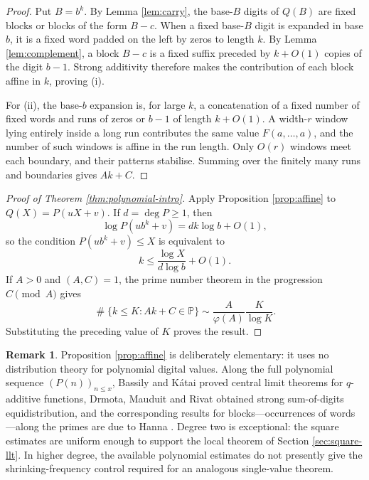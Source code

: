 \documentclass[11pt,reqno]{amsart}
\theoremstyle{plain}
\theoremstyle{definition}
\newtheorem{remark}[theorem]{Remark}
\newcommand{\Pp}{\mathbb{P}}
\newcommand{\1}{\mathbf 1}
\DeclareMathOperator{\Card}{\#}
\begin{document}
\begin{proof}
Put $B=b^k$.  By Lemma \ref{lem:carry}, the base-$B$ digits of $Q(B)$ are fixed blocks or blocks of the form $B-c$.  When a fixed base-$B$ digit is expanded in base $b$, it is a fixed word padded on the left by zeros to length $k$.  By Lemma \ref{lem:complement}, a block $B-c$ is a fixed suffix preceded by $k+O(1)$ copies of the digit $b-1$.  Strong additivity therefore makes the contribution of each block affine in $k$, proving (i).

For (ii), the base-$b$ expansion is, for large $k$, a concatenation of a fixed number of fixed words and runs of zeros or $b-1$ of length $k+O(1)$.  A width-$r$ window lying entirely inside a long run contributes the same value $F(a,\ldots,a)$, and the number of such windows is affine in the run length.  Only $O(r)$ windows meet each boundary, and their patterns stabilise.  Summing over the finitely many runs and boundaries gives $Ak+C$.
\end{proof}

\begin{proof}[Proof of Theorem \ref{thm:polynomial-intro}]
Apply Proposition \ref{prop:affine} to
$Q(X)=P(uX+v)$.
If $d=\deg P\ge1$, then
\[
 \log P(ub^k+v)=dk\log b+O(1),
\]
so the condition $P(ub^k+v)\le X$ is equivalent to
\[
 k\le \frac{\log X}{d\log b}+O(1).
\]
If $A>0$ and $(A,C)=1$, the prime number theorem in the progression $C\pmod A$ gives
\[
 \Card\{k\le K:Ak+C\in\Pp\}
 \sim \frac{A}{\varphi(A)}\frac{K}{\log K}.
\]
Substituting the preceding value of $K$ proves the result.
\end{proof}

\begin{remark}\label{rem:blockscope}
Proposition \ref{prop:affine} is deliberately elementary: it uses no distribution theory for polynomial digital values.  Along the full polynomial sequence $(P(n))_{n\le x}$, Bassily and K\'atai \cite{bassilykatai} proved central limit theorems for $q$-additive functions, Drmota, Mauduit and Rivat \cite{dmr-polynomial} obtained strong sum-of-digits equidistribution, and the corresponding results for blocks---occurrences of words---along the primes are due to Hanna \cite{hanna}.  Degree two is exceptional: the square estimates are uniform enough to support the local theorem of Section \ref{sec:square-llt}.  In higher degree, the available polynomial estimates do not presently give the shrinking-frequency control required for an analogous single-value theorem.
\end{remark}
\end{document}

